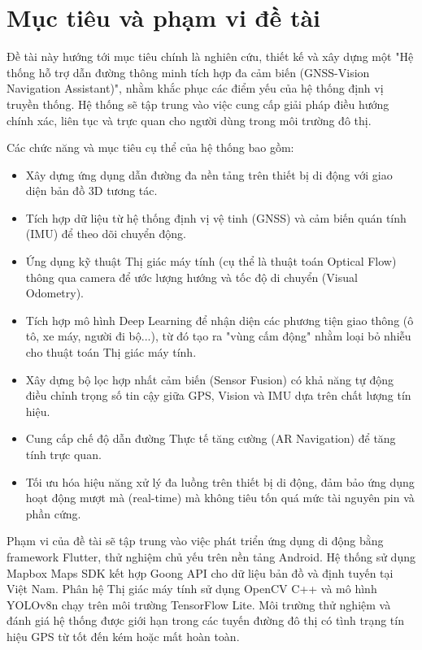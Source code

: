 \documentclass[../DoAn.tex]{subfiles}
\begin{document}
\section{Mục tiêu và phạm vi đề tài}
\label{section:1.2}
Đề tài này hướng tới mục tiêu chính là nghiên cứu, thiết kế và xây dựng một "Hệ thống hỗ trợ dẫn đường thông minh tích hợp đa cảm biến (GNSS-Vision Navigation Assistant)", nhằm khắc phục các điểm yếu của hệ thống định vị truyền thống. Hệ thống sẽ tập trung vào việc cung cấp giải pháp điều hướng chính xác, liên tục và trực quan cho người dùng trong môi trường đô thị.

Các chức năng và mục tiêu cụ thể của hệ thống bao gồm:
\begin{itemize}
    \item Xây dựng ứng dụng dẫn đường đa nền tảng trên thiết bị di động với giao diện bản đồ 3D tương tác.
    \item Tích hợp dữ liệu từ hệ thống định vị vệ tinh (GNSS) và cảm biến quán tính (IMU) để theo dõi chuyển động.
    \item Ứng dụng kỹ thuật Thị giác máy tính (cụ thể là thuật toán Optical Flow) thông qua camera để ước lượng hướng và tốc độ di chuyển (Visual Odometry).
    \item Tích hợp mô hình Deep Learning để nhận diện các phương tiện giao thông (ô tô, xe máy, người đi bộ...), từ đó tạo ra "vùng cấm động" nhằm loại bỏ nhiễu cho thuật toán Thị giác máy tính.
    \item Xây dựng bộ lọc hợp nhất cảm biến (Sensor Fusion) có khả năng tự động điều chỉnh trọng số tin cậy giữa GPS, Vision và IMU dựa trên chất lượng tín hiệu.
    \item Cung cấp chế độ dẫn đường Thực tế tăng cường (AR Navigation) để tăng tính trực quan.
    \item Tối ưu hóa hiệu năng xử lý đa luồng trên thiết bị di động, đảm bảo ứng dụng hoạt động mượt mà (real-time) mà không tiêu tốn quá mức tài nguyên pin và phần cứng.
\end{itemize}

Phạm vi của đề tài sẽ tập trung vào việc phát triển ứng dụng di động bằng framework Flutter, thử nghiệm chủ yếu trên nền tảng Android. Hệ thống sử dụng Mapbox Maps SDK kết hợp Goong API cho dữ liệu bản đồ và định tuyến tại Việt Nam. Phân hệ Thị giác máy tính sử dụng OpenCV C++ và mô hình YOLOv8n chạy trên môi trường TensorFlow Lite. Môi trường thử nghiệm và đánh giá hệ thống được giới hạn trong các tuyến đường đô thị có tình trạng tín hiệu GPS từ tốt đến kém hoặc mất hoàn toàn.
\end{document}
